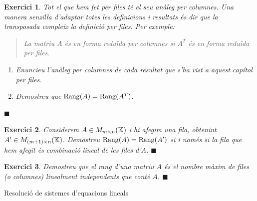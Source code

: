 \documentclass[
  11pt,
]{book}
\makeatletter
\numberwithin{dummy}{section}
\theoremstyle{maincolornumbox}
\newtheorem{exerciseT}{Exercici}[chapter]
\theoremstyle{blacknumex}
\theoremstyle{blacknumbox}
\theoremstyle{maincolornum}
\newenvironment{exercise}{\begin{eBox}\begin{exerciseT}}{\hfill{\color{maincolor}\tiny\ensuremath{\blacksquare}}\end{exerciseT}\end{eBox}}
\renewcommand{\section}{\@startsection{section}{1}{\z@}
{-4ex \@plus -1ex \@minus -.4ex}
{1ex \@plus.2ex }
{\normalfont\large\sffamily\bfseries}}
\makeatother
\begin{document}
\begin{exercise}

Tot el que hem fet per files té el seu anàleg per columnes. Una manera
senzilla d'adaptar totes les definicions i resultats és dir que la
transposada compleix la definició per files. Per exemple:

\begin{quote}
La matriu \(A\) és \emph{en forma reduïda per columnes} si \(A^T\) és en forma
reduïda per files.
\end{quote}

\begin{enumerate}
\def\labelenumi{(\alph{enumi})}
\item
  Enuncieu l'anàleg per columnes de cada resultat que s'ha vist a
  aquest capítol per files.
\item
  Demostreu que \(\operatorname{Rang}(A)=\operatorname{Rang}(A^T)\).
\end{enumerate}

\end{exercise}

\begin{exercise}
Considerem \(A\in M_{m\times n}(\mathbb{K})\) i hi afegim una fila, obtenint
\(A'\in M_{(m+1)\times n}(\mathbb{K})\). Demostreu \(\operatorname{Rang}(A)=\operatorname{Rang}(A')\) si i només
si la fila que hem afegit és combinació lineal de les files d'\(A\).
\end{exercise}

\begin{exercise}
Demostreu que el rang d'una matriu \(A\) és el nombre màxim de files (o
columnes) linealment independents que conté \(A\).
\end{exercise}

\hypertarget{resoluciuxf3-de-sistemes-dequacions-lineals}{%
\section{Resolució de sistemes d'equacions lineals}\label{resoluciuxf3-de-sistemes-dequacions-lineals}}
\end{document}
